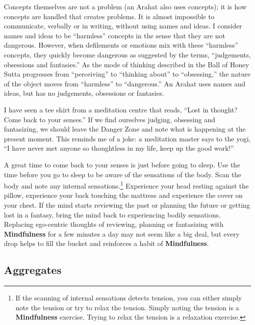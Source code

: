 Concepts themselves are not a problem (an Arahat also uses concepts); it is how concepts are handled that creates problems. It is almost impossible to communicate, verbally or in writing, without using names and ideas. I consider names and ideas to be “harmless” concepts in the sense that they are not dangerous. However, when defilements or emotions mix with these “harmless” concepts, they quickly become dangerous as suggested by the terms, “judgements, obsessions and fantasies.” As the mode of thinking described in the Ball of Honey Sutta progresses from “perceiving” to “thinking about” to “obsessing,” the nature of the object moves from “harmless” to “dangerous.” An Arahat uses names and ideas, but has no judgements, obsessions or fantasies.

I have seen a tee shirt from a meditation centre that reads, “Lost in thought? Come back to your senses.” If we find ourselves judging, obsessing and fantasizing, we should leave the Danger Zone and note what is happening at the present moment. This reminds me of a joke: a meditation master says to the yogi, “I have never met anyone so thoughtless in my life, keep up the good work!”

\pagebreak

A great time to come back to your senses is just before going to sleep. Use the time before you go to sleep to be aware of the sensations of the body. Scan the body and note any internal sensations.\footnote{If the scanning of internal sensations detects tension, you can either simply note the tension or try to relax the tension. Simply noting the tension is a \textbf{Mindfulness} exercise. Trying to relax the tension is a relaxation exercise.} Experience your head resting against the pillow, experience your back touching the mattress and experience the cover on your chest. If the mind starts reviewing the past or planning the future or getting lost in a fantasy, bring the mind back to experiencing bodily sensations. Replacing ego-centric thoughts of reviewing, planning or fantasizing with \textbf{Mindfulness} for a few minutes a day may not seem like a big deal, but every drop helps to fill the bucket and reinforces a habit of \textbf{Mindfulness}.

\subsection*{Aggregates}

